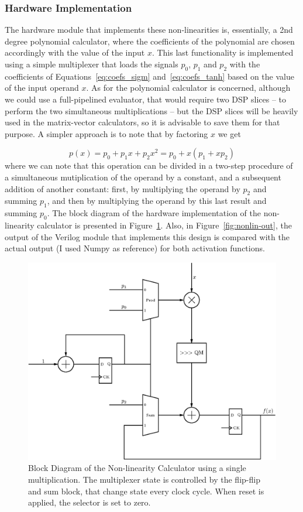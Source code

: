 \subsubsection{Hardware Implementation}
The hardware module that implements these non-linearities is, essentially, a 2nd degree polynomial calculator, where the coefficients of the polynomial are chosen accordingly with the value of the input $x$. This last functionality
is implemented using a simple multiplexer that loads the signals $p_0$, $p_1$ and $p_2$ with the coefficients of Equations~\ref{eq:coefs_sigm} and~\ref{eq:coefs_tanh} based on the value of the input operand $x$. As for the polynomial calculator is concerned, although we could use a full-pipelined evaluator, that would require two DSP slices -- to perform the two simultaneous multiplications -- but the DSP slices will be heavily used in the matrix-vector calculators, so it is advisable to save them for that purpose. A simpler approach is to note that by factoring $x$ we get

\begin{equation}\label{eq:factorPol}
p(x) = p_0 + p_1x + p_2x^2 = p_0 + x(p_1 + xp_2)
\end{equation}
where we can note that this operation can be divided in a two-step procedure of a simultaneous mutiplication of the operand by a constant, and a subsequent addition of another constant: first, by multiplying the operand by $p_2$ and summing $p_1$, and then by multiplying the operand by this last result and summing $p_0$. The block diagram of the hardware implementation of the non-linearity calculator is presented in Figure~\ref{fig:nonlin}. Also, in Figure~\ref{fig:nonlin-out}, the output of the Verilog module that implements this design is compared with the actual output (I used Numpy as reference) for both activation functions.

\begin{figure}
    \centering
    \includegraphics[width=0.9\linewidth]{figures/non-lin.eps}
    \caption[Block Diagram of the Non-linearity Calculator]{Block Diagram of the Non-linearity Calculator using a single multiplication. The multiplexer state is controlled by the flip-flip and sum block, that change state every clock cycle. When reset is applied, the selector is set to zero.}
    \label{fig:nonlin}
\end{figure}

